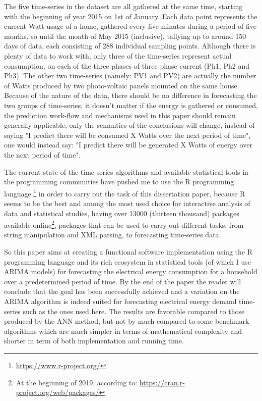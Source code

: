\documentclass[12pt,a4paper,titlepage]{report}
\begin{document}
The five time-series in the dataset are all gathered at the same time, starting with the beginning of year 2015 on 1st of January. Each data point represents the current Watt usage of a home, gathered every five minutes during a period of five months, so until the month of May 2015 (inclusive), tallying up to around 150 days of data, each consisting of 288 individual sampling points. Although there is plenty of data to work with, only three of the time-series represent actual consumption, on each of the three phases of three phase current (Ph1, Ph2 and Ph3). The other two time-series (namely: PV1 and PV2) are actually the number of Watts produced by two photo-voltaic panels mounted on the same house.
Because of the nature of the data, there should be no difference in forecasting the two groups of time-series, it doesn't matter if the energy is gathered or consumed, the prediction work-flow and mechanisms used in this paper should remain generally applicable, only the semantics of the conclusions will change, instead of saying "I predict there will be consumed X Watts over the next period of time", one would instead say: "I predict there will be generated X Watts of energy over the next period of time".

The current state of the time-series algorithms and available statistical tools in the programming communities have pushed me to use the R programming language \footnote{\url{https://www.r-project.org/}} in order to carry out the task of this dissertation paper, because R seems to be the best and among the most used \cite{Rdesign} choice for interactive analysis of data and statistical studies, having over 13000 (thirteen thousand) packages available online\footnote{At the beginning of 2019, according to: \url{https://cran.r-project.org/web/packages/}}, packages that can be used to carry out different tasks, from string manipulation and XML parsing, to forecasting time-series data.

So this paper aims at creating a functional software implementation using the R programming language and its rich ecosystem in statistical tools (of which I use ARIMA models) for forecasting the electrical energy consumption for a household over a predetermined period of time. By the end of the paper the reader will conclude that the goal has been successfully achieved and a variation on the ARIMA algorithm is indeed suited for forecasting electrical energy demand time-series such as the ones used here. The results are favorable compared to those produced by the ANN method, but not by much compared to some benchmark algorithms which are much simpler in terms of mathematical complexity and shorter in term of both implementation and running time.
\end{document}
